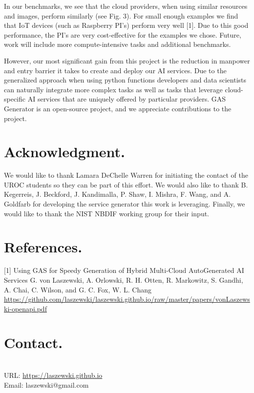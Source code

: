 \documentclass[letter,10pt]{article}
\begin{document}
\begin{multicols}{3}
In our benchmarks, we see that the cloud providers, when using similar resources and images, perform similarly (see Fig. 3). For small enough examples we find that IoT devices (such as Raspberry PI's) perform very well [1]. Due to this good performance, the PI's are very cost-effective for the examples we chose.
Future, work will include more compute-intensive tasks and additional benchmarks.

However, our most significant gain from this project is the reduction in manpower and entry barrier it takes to create and deploy our AI services. Due to the generalized approach when using python functions developers and data scientists can naturally integrate more complex tasks as well as tasks that leverage cloud-specific AI services that are uniquely offered by particular providers. GAS Generator is an open-source project, and we appreciate contributions to the project. 

\section*{Acknowledgment.}

We would like to thank Lamara DeChelle Warren for initiating the contact of the UROC students so they can be part of this effort. 
We would also like to thank
B. Kegerreis,
J. Beckford,
J. Kandimalla,
P. Shaw,
I. Mishra,
F. Wang, and A. Goldfarb for developing the service generator this work is leveraging. Finally, we would like to thank the NIST NBDIF working group for their input.

\section*{References.}

[1] Using GAS for Speedy Generation of Hybrid Multi-Cloud AutoGenerated AI Services
G. von Laszewski,
A. Orlowski,
R. H. Otten,
R. Markowitz,
S. Gandhi,
A. Chai,
C. Wilson, and
G. C. Fox,
W. L. Chang
\url{https://github.com/laszewski/laszewski.github.io/raw/master/papers/vonLaszewski-openapi.pdf}

%
%

\section*{Contact.} ~\\

URL: \url{https://laszewski.github.io}\\
Email: laszewski@gmail.com


\end{multicols}
\end{document}
